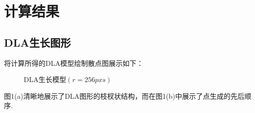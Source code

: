 \documentclass[12pt,a4paper,utf8]{ctexart}
\begin{document}
\newpage
\section{计算结果}

\subsection{DLA生长图形}
将计算所得的DLA模型绘制散点图展示如下：
\begin{figure}[!h]
    \centering
    \hfill
    \caption{DLA生长模型$(r=256pxs)$}
\end{figure}

图1(a)清晰地展示了DLA图形的枝杈状结构，而在图1(b)中展示了点生成的先后顺序.
\end{document}
